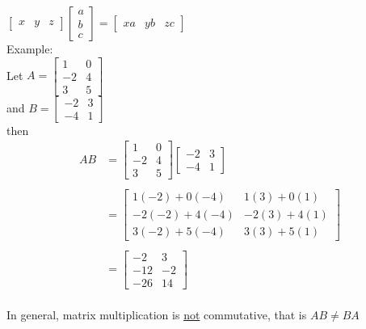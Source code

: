 \documentclass{jhwhw}
\begin{document}
\(\begin{bmatrix} x & y & z \end{bmatrix} \begin{bmatrix} a \\ b \\ c \end{bmatrix} = \begin{bmatrix} xa & yb & zc \end{bmatrix}\)\\

Example:\\

Let \(A = \begin{bmatrix}  1 & 0 \\  -2 & 4 \\ 3 & 5 \end{bmatrix}\)\\
and \(B = \begin{bmatrix} -2 & 3 \\ -4 & 1 \end{bmatrix}\)\\
then \\

\begin{align*} AB &= \begin{bmatrix}  1 & 0 \\  -2 & 4 \\ 3 & 5 \end{bmatrix} \begin{bmatrix} -2 & 3 \\ -4 & 1 \end{bmatrix} \\ \\
&= \begin{bmatrix} 1(-2)+0(-4) & 1(3)+0(1) \\ -2(-2)+4(-4) & -2(3)+4(1) \\ 3(-2)+5(-4) & 3(3)+5(1) \end{bmatrix}\\ \\
&= \begin{bmatrix} -2 & 3 \\ -12 & -2 \\ -26 & 14 \end{bmatrix}
\end{align*}
\\

In general, matrix multiplication is \underline{not} commutative, that is \(AB \neq BA\)\\ \\
\end{document}
